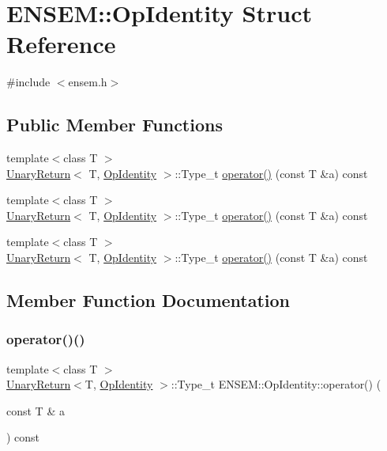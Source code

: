 \hypertarget{structENSEM_1_1OpIdentity}{}\section{E\+N\+S\+EM\+:\+:Op\+Identity Struct Reference}
\label{structENSEM_1_1OpIdentity}


{\ttfamily \#include $<$ensem.\+h$>$}

\subsection*{Public Member Functions}
\begin{DoxyCompactItemize}
\item 
{\footnotesize template$<$class T $>$ }\\\mbox{\hyperlink{structENSEM_1_1UnaryReturn}{Unary\+Return}}$<$ T, \mbox{\hyperlink{structENSEM_1_1OpIdentity}{Op\+Identity}} $>$\+::Type\+\_\+t \mbox{\hyperlink{structENSEM_1_1OpIdentity_a4ff09949750390fcf0e8f6a85b20a1ec}{operator()}} (const T \&a) const
\item 
{\footnotesize template$<$class T $>$ }\\\mbox{\hyperlink{structENSEM_1_1UnaryReturn}{Unary\+Return}}$<$ T, \mbox{\hyperlink{structENSEM_1_1OpIdentity}{Op\+Identity}} $>$\+::Type\+\_\+t \mbox{\hyperlink{structENSEM_1_1OpIdentity_a4ff09949750390fcf0e8f6a85b20a1ec}{operator()}} (const T \&a) const
\item 
{\footnotesize template$<$class T $>$ }\\\mbox{\hyperlink{structENSEM_1_1UnaryReturn}{Unary\+Return}}$<$ T, \mbox{\hyperlink{structENSEM_1_1OpIdentity}{Op\+Identity}} $>$\+::Type\+\_\+t \mbox{\hyperlink{structENSEM_1_1OpIdentity_a4ff09949750390fcf0e8f6a85b20a1ec}{operator()}} (const T \&a) const
\end{DoxyCompactItemize}


\subsection{Member Function Documentation}
\mbox{\label{structENSEM_1_1OpIdentity_a4ff09949750390fcf0e8f6a85b20a1ec}} 
\subsubsection{\texorpdfstring{operator()()}{operator()()}\hspace{0.1cm}{\footnotesize\ttfamily [1/3]}}
{\footnotesize\ttfamily template$<$class T $>$ \\
\mbox{\hyperlink{structENSEM_1_1UnaryReturn}{Unary\+Return}}$<$T, \mbox{\hyperlink{structENSEM_1_1OpIdentity}{Op\+Identity}} $>$\+::Type\+\_\+t E\+N\+S\+E\+M\+::\+Op\+Identity\+::operator() (\begin{DoxyParamCaption}\item[{const T \&}]{a }\end{DoxyParamCaption}) const\hspace{0.3cm}{\ttfamily [inline]}}

